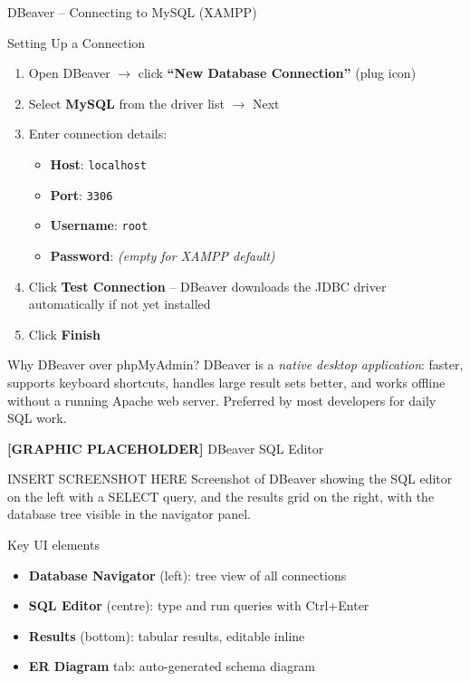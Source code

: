 \begin{frame}{DBeaver -- Connecting to MySQL (XAMPP)}
  \begin{block}{Setting Up a Connection}
    \begin{enumerate}
      \item Open DBeaver $\to$ click \textbf{``New Database Connection''} (plug icon)
      \item Select \textbf{MySQL} from the driver list $\to$ Next
      \item Enter connection details:
        \begin{itemize}
          \item \textbf{Host}: \texttt{localhost}
          \item \textbf{Port}: \texttt{3306}
          \item \textbf{Username}: \texttt{root}
          \item \textbf{Password}: \textit{(empty for XAMPP default)}
        \end{itemize}
      \item Click \textbf{Test Connection} -- DBeaver downloads the JDBC driver
            automatically if not yet installed
      \item Click \textbf{Finish}
    \end{enumerate}
  \end{block}

  \begin{examples}{Why DBeaver over phpMyAdmin?}
    DBeaver is a \emph{native desktop application}: faster, supports keyboard
    shortcuts, handles large result sets better, and works offline without a
    running Apache web server. Preferred by most developers for daily SQL work.
  \end{examples}
\end{frame}

\begin{frame}{\textbf{[GRAPHIC PLACEHOLDER]} DBeaver SQL Editor}
  \begin{alertblock}{INSERT SCREENSHOT HERE}
    Screenshot of DBeaver showing the SQL editor on the left with a
    SELECT query, and the results grid on the right, with the database
    tree visible in the navigator panel.
  \end{alertblock}

  \begin{block}{Key UI elements}
    \begin{itemize}
      \item \textbf{Database Navigator} (left): tree view of all connections
      \item \textbf{SQL Editor} (centre): type and run queries with Ctrl+Enter
      \item \textbf{Results} (bottom): tabular results, editable inline
      \item \textbf{ER Diagram} tab: auto-generated schema diagram
    \end{itemize}
  \end{block}
\end{frame}
